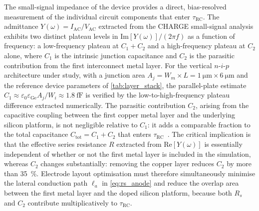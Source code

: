 The small-signal impedance of the device provides a direct, bias-resolved
measurement of the individual circuit components that enter $\tau_{\mathrm{RC}}$.
The admittance $Y(\omega) = I_{\mathrm{AC}}/V_{\mathrm{AC}}$ extracted from
the CHARGE small-signal analysis exhibits two distinct plateau levels in
$\mathrm{Im}[Y(\omega)]/(2\pi f)$ as a function of frequency: a low-frequency
plateau at $C_1 + C_2$ and a high-frequency plateau at $C_2$ alone, where
$C_1$ is the intrinsic junction capacitance and $C_2$ is the parasitic
contribution from the first interconnect metal layer. For the vertical
$n$-$i$-$p$ architecture under study, with a junction area
$A_j = W_m \times L = \SI{1}{\micro\metre} \times \SI{6}{\micro\metre}$ and
the reference device parameters of \cref{tab:layer_stack}, the parallel-plate
estimate $C_1 \approx \varepsilon_0 \varepsilon_{\mathrm{Ge}} A_j / W_i
\approx \SI{1.8}{\femto\farad}$ is verified by the low-to-high-frequency
plateau difference extracted numerically. The parasitic contribution $C_2$,
arising from the capacitive coupling between the first copper metal layer and
the underlying silicon platform, is not negligible relative to $C_1$: it adds
a comparable fraction to the total capacitance $C_{\mathrm{tot}} = C_1 + C_2$
that enters $\tau_{\mathrm{RC}}$~\cite{Alasio2024}. The critical implication
is that the effective series resistance $R$ extracted from
$\mathrm{Re}[Y(\omega)]$ is essentially independent of whether or not the
first metal layer is included in the simulation, whereas $C_2$ changes
substantially: removing the copper layer reduces $C_2$ by more than
\SI{35}{\percent}. Electrode layout optimisation must therefore simultaneously
minimise the lateral conduction path $\ell_a$ in \cref{eq:rs_anode} and
reduce the overlap area between the first metal layer and the doped silicon
platform, because both $R_s$ and $C_2$ contribute multiplicatively to
$\tau_{\mathrm{RC}}$.



